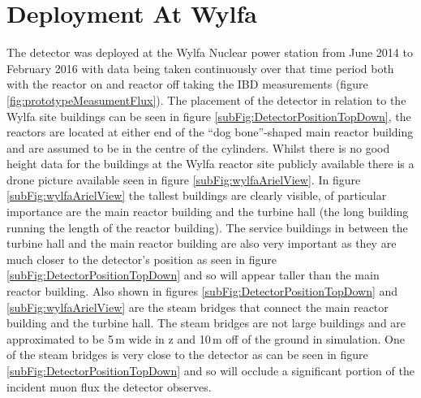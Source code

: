 \section{Deployment At Wylfa}\label{sec:deploymentAtWylfa}
The detector was deployed at the Wylfa Nuclear power station from June 2014 to February 2016 with data being taken continuously over that time period both with the reactor on and reactor off taking the IBD measurements \cite{Carroll_2018} (figure \ref{fig:prototypeMeasumentFlux}). The placement of the detector in relation to the Wylfa site buildings can be seen in figure \ref{subFig:DetectorPositionTopDown}, the reactors are located at either end of the ``dog bone''-shaped main reactor building and are assumed to be in the centre of the cylinders. Whilst there is no good height data for the buildings at the Wylfa reactor site publicly available there is a drone picture available seen in figure \ref{subFig:wylfaArielView}. In figure \ref{subFig:wylfaArielView} the tallest buildings are clearly visible, of particular importance are the main reactor building and the turbine hall (the long building running the length of the reactor building). The service buildings in between the turbine hall and the  main reactor building are also very important as they are much closer to the detector's position as seen in figure \ref{subFig:DetectorPositionTopDown} and so will appear taller than the main reactor building. Also shown in figures \ref{subFig:DetectorPositionTopDown} and \ref{subFig:wylfaArielView} are the steam bridges that connect the main reactor building and the turbine hall. The steam bridges are not large buildings and are approximated to be 5\,m wide in z and 10\,m off of the ground in simulation. One of the steam bridges is very close to the detector as can be seen in figure \ref{subFig:DetectorPositionTopDown} and so will occlude a significant portion of the incident muon flux the detector observes. 

